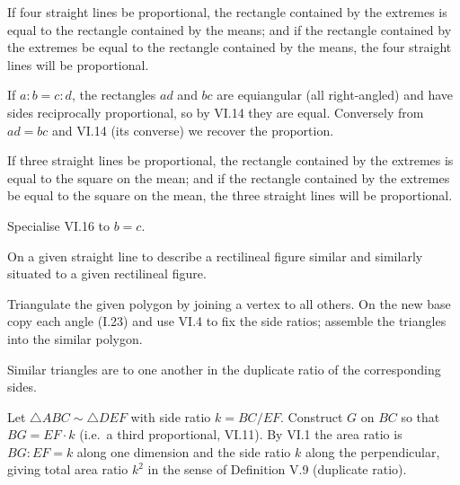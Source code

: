 \begin{claim}
\label{prop:VI.16}
If four straight lines be proportional, the rectangle contained by the
extremes is equal to the rectangle contained by the means; and if the
rectangle contained by the extremes be equal to the rectangle
contained by the means, the four straight lines will be proportional.
\end{claim}
\begin{evidence}[Proof of VI.16]
\label{ev:VI.16}
If $a : b = c : d$, the rectangles $ad$ and $bc$ are equiangular
(all right-angled) and have sides reciprocally proportional, so by
VI.14 they are equal.  Conversely from $ad = bc$ and VI.14 (its
converse) we recover the proportion.
\end{evidence}

\begin{claim}
\label{prop:VI.17}
If three straight lines be proportional, the rectangle contained by
the extremes is equal to the square on the mean; and if the rectangle
contained by the extremes be equal to the square on the mean, the
three straight lines will be proportional.
\end{claim}
\begin{evidence}[Proof of VI.17]
\label{ev:VI.17}
Specialise VI.16 to $b = c$.
\end{evidence}

\begin{claim}
\label{prop:VI.18}
On a given straight line to describe a rectilineal figure similar
and similarly situated to a given rectilineal figure.
\end{claim}
\begin{evidence}[Proof of VI.18]
\label{ev:VI.18}
Triangulate the given polygon by joining a vertex to all others.  On
the new base copy each angle (I.23) and use VI.4 to fix the side
ratios; assemble the triangles into the similar polygon.
\end{evidence}

\begin{claim}
\label{prop:VI.19}
Similar triangles are to one another in the duplicate ratio of the
corresponding sides.
\end{claim}
\begin{evidence}[Proof of VI.19]
\label{ev:VI.19}
Let $\triangle ABC \sim \triangle DEF$ with side ratio $k = BC / EF$.
Construct $G$ on $BC$ so that $BG = EF \cdot k$ (i.e.\ a third
proportional, VI.11).  By VI.1 the area ratio is $BG : EF = k$ along
one dimension and the side ratio $k$ along the perpendicular, giving
total area ratio $k^2$ in the sense of Definition V.9 (duplicate
ratio).
\end{evidence}

